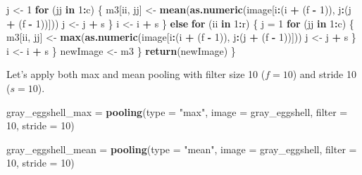 \documentclass[12pt,]{krantz}
\makeatletter
\newenvironment{Shaded}{\begin{snugshade}}{\end{snugshade}}
\newcommand{\ControlFlowTok}[1]{\textcolor[rgb]{0.27,0.27,0.27}{\textbf{#1}}}
\newcommand{\DataTypeTok}[1]{\textcolor[rgb]{0.27,0.27,0.27}{#1}}
\newcommand{\DecValTok}[1]{\textcolor[rgb]{0.06,0.06,0.06}{#1}}
\newcommand{\KeywordTok}[1]{\textcolor[rgb]{0.27,0.27,0.27}{\textbf{#1}}}
\newcommand{\NormalTok}[1]{#1}
\newcommand{\OperatorTok}[1]{\textcolor[rgb]{0.43,0.43,0.43}{\textbf{#1}}}
\newcommand{\StringTok}[1]{\textcolor[rgb]{0.5,0.5,0.5}{#1}}
\newenvironment{kframe}{%
\medskip{}
\setlength{\fboxsep}{.8em}
 \def\at@end@of@kframe{}%
 \ifinner\ifhmode%
  \def\at@end@of@kframe{\end{minipage}}%
  \begin{minipage}{\columnwidth}%
 \fi\fi%
 \def\FrameCommand##1{\hskip\@totalleftmargin \hskip-\fboxsep
 \colorbox{shadecolor}{##1}\hskip-\fboxsep
     \hskip-\linewidth \hskip-\@totalleftmargin \hskip\columnwidth}%
 \MakeFramed {\advance\hsize-\width
   \@totalleftmargin\z@ \linewidth\hsize
   \@setminipage}}%
 {\par\unskip\endMakeFramed%
 \at@end@of@kframe}
\renewenvironment{Shaded}{\begin{kframe}}{\end{kframe}}
\makeatother
\begin{document}
\begin{Shaded}
\begin{Highlighting}[]
\NormalTok{                j <-}\StringTok{ }\DecValTok{1}
                \ControlFlowTok{for}\NormalTok{ (jj }\ControlFlowTok{in} \DecValTok{1}\OperatorTok{:}\NormalTok{c) \{}
\NormalTok{                  m3[ii, jj] <-}\StringTok{ }\KeywordTok{mean}\NormalTok{(}\KeywordTok{as.numeric}\NormalTok{(image[i}\OperatorTok{:}\NormalTok{(i }\OperatorTok{+}\StringTok{ }
\StringTok{                    }\NormalTok{(f }\OperatorTok{-}\StringTok{ }\DecValTok{1}\NormalTok{)), j}\OperatorTok{:}\NormalTok{(j }\OperatorTok{+}\StringTok{ }\NormalTok{(f }\OperatorTok{-}\StringTok{ }\DecValTok{1}\NormalTok{))]))}
\NormalTok{                  j <-}\StringTok{ }\NormalTok{j }\OperatorTok{+}\StringTok{ }\NormalTok{s}
\NormalTok{                \}}
\NormalTok{                i <-}\StringTok{ }\NormalTok{i }\OperatorTok{+}\StringTok{ }\NormalTok{s}
\NormalTok{            \} }\ControlFlowTok{else} \ControlFlowTok{for}\NormalTok{ (ii }\ControlFlowTok{in} \DecValTok{1}\OperatorTok{:}\NormalTok{r) \{}
\NormalTok{            j =}\StringTok{ }\DecValTok{1}
            \ControlFlowTok{for}\NormalTok{ (jj }\ControlFlowTok{in} \DecValTok{1}\OperatorTok{:}\NormalTok{c) \{}
\NormalTok{                m3[ii, jj] <-}\StringTok{ }\KeywordTok{max}\NormalTok{(}\KeywordTok{as.numeric}\NormalTok{(image[i}\OperatorTok{:}\NormalTok{(i }\OperatorTok{+}\StringTok{ }
\StringTok{                  }\NormalTok{(f }\OperatorTok{-}\StringTok{ }\DecValTok{1}\NormalTok{)), j}\OperatorTok{:}\NormalTok{(j }\OperatorTok{+}\StringTok{ }\NormalTok{(f }\OperatorTok{-}\StringTok{ }\DecValTok{1}\NormalTok{))]))}
\NormalTok{                j <-}\StringTok{ }\NormalTok{j }\OperatorTok{+}\StringTok{ }\NormalTok{s}
\NormalTok{            \}}
\NormalTok{            i <-}\StringTok{ }\NormalTok{i }\OperatorTok{+}\StringTok{ }\NormalTok{s}
\NormalTok{        \}}
\NormalTok{        newImage <-}\StringTok{ }\NormalTok{m3}
\NormalTok{    \}}
    \KeywordTok{return}\NormalTok{(newImage)}
\NormalTok{\}}
\end{Highlighting}
\end{Shaded}

Let's apply both max and mean pooling with filter size 10 (\(f = 10\)) and stride 10 (\(s = 10\)).

\begin{Shaded}
\begin{Highlighting}[]
\NormalTok{gray_eggshell_max =}\StringTok{ }\KeywordTok{pooling}\NormalTok{(}\DataTypeTok{type =} \StringTok{"max"}\NormalTok{,}
                            \DataTypeTok{image =}\NormalTok{ gray_eggshell,}
                            \DataTypeTok{filter =} \DecValTok{10}\NormalTok{, }\DataTypeTok{stride =} \DecValTok{10}\NormalTok{)}

\NormalTok{gray_eggshell_mean =}\StringTok{ }\KeywordTok{pooling}\NormalTok{(}\DataTypeTok{type =} \StringTok{"mean"}\NormalTok{,}
                             \DataTypeTok{image =}\NormalTok{ gray_eggshell,}
                             \DataTypeTok{filter =} \DecValTok{10}\NormalTok{, }\DataTypeTok{stride =} \DecValTok{10}\NormalTok{)}
\end{Highlighting}
\end{Shaded}
\end{document}
